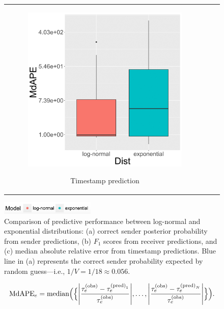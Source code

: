 \documentclass[ba]{imsart}
\numberwithin{equation}{section}
\theoremstyle{plain}
\DeclarePairedDelimiter\abs{\lvert}{\rvert}
\begin{document}
\begin{figure}[!t]
\begin{tabular}[t]{ccc}
\begin{subfigure}[b]{0.33\textwidth}
				\label{subfigure:PPEresults2}
			\end{subfigure}
			\begin{subfigure}[b]{0.33\textwidth}
				\caption{Timestamp prediction}
				\includegraphics[width=\textwidth]{img/timepredict-1.png}
				\label{subfigure:PPEresults3}	
			\end{subfigure}
		\end{tabular}
		\includegraphics[width=0.4\textwidth]{img/modellabel.png}				
		\caption {Comparison of predictive performance between log-normal and exponential distributions: (a) correct sender posterior probability from sender predictions, (b) $F_1$ scores from receiver predictions, and (c) median absolute relative error from timestamp predictions. Blue line in (a) represents the correct sender probability expected by random guess---i.e., $1/V=1/18\approx0.056$.}
		\label{figure:PPEresults}
	\end{figure}		
	\begin{equation}
		\mbox{MdAPE}_{e} = \mbox{median}\Big(\Big\{\abs*{\frac{\tau^{\textrm{(obs)}}_e - \tau^{\textrm{(pred)}_1}_{e}}{\tau^{\textrm{(obs)}}_e}},\ldots, \abs*{\frac{\tau^{\textrm{(obs)}}_e - \tau^{\textrm{(pred)}_N}_{e}}{\tau^{\textrm{(obs)}}_e}}\Big\}\Big).
	\end{equation}
\end{document}
